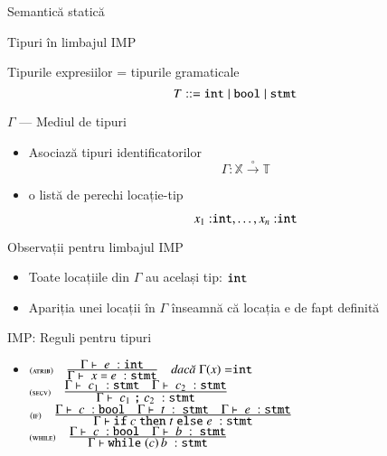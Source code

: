 \documentclass[xcolor=pdftex,romanian,colorlinks]{beamer}
\begin{document}
\begin{section}{Semantică statică}
    \begin{frame}{Tipuri în limbajul IMP}
    \begin{block}{Tipurile expresiilor = tipurile gramaticale}
    \[T ::= {\mathrel{\text{\ttfamily int}}} \mid {\ensuremath\mathrel{\text{\ttfamily bool}}} \mid {\ensuremath\mathrel{\text{\ttfamily stmt}}}\]
    \end{block}
    \begin{block}{$\Gamma$ --- Mediul de tipuri}
    \begin{itemize}
    \item Asociază tipuri identificatorilor
    \[\Gamma : \mathbb{X} \xrightarrow{\circ}\mathbb{T}\]
    \item {} o listă de perechi locație-tip

    \[x_1:\mathrel{\text{\ttfamily int}}, \ldots, x_n:\mathrel{\text{\ttfamily int}}\]
    \end{itemize}
  \end{block}
    \vfill
    \begin{block}{Observații pentru limbajul IMP}
    \begin{itemize}
    \item Toate locațiile din $\Gamma$ au același tip: $\mathrel{\text{\ttfamily int}}$
    \item Apariția unei locații în $\Gamma$ înseamnă că locația e de fapt definită
    \end{itemize}
    \end{block}
    \end{frame}

    \begin{frame}{IMP: Reguli pentru tipuri}
    \begin{itemize}
    \vitem[] $\reg[loc]{\tjud{x}{int}}{}{\Gamma(x) = \Sint}$
    \vitem[] $\reg[int]{\tjud{n}{\Sint}}{}{n \in \mathbb{Z}}$
    \vitem[] $\reg[op+]{\tjud{e_1 + e_2}{\Sint}}{\tjud{e_1}{\Sint} \si \tjud{e_2}{\Sint}}{}$
    \vitem[] $\reg[bool]{\tjud{b}{\Sbool}}{}{b\in \{\Strue,\Sfalse\}}$
    \vitem[] $\reg[op$\leq$]{\tjud{e_1 \terminal{<=} e_2}{\Sbool}}{\tjud{e_1}{\Sint} \si \tjud{e_2}{\Sint}}{}$
    \item[] $\reg[atrib]{\tjud{x\terminal{=}e}{\terminal{stmt}}}{\tjud{e}{\Sint}}{\Gamma(x) = \Sint}$
    \vitem[] $\reg[secv]{\tjud{c_1\terminal{;} c_2}{\terminal{stmt}}}{\tjud{c_1}{\terminal{stmt}}\si \tjud{c_2}{\terminal{stmt}}}{}$
    \vitem[] $\reg[if]{\tjud{\Sif c \Sthen t \Selse e}{\terminal{stmt}}}{\tjud{c}{\Sbool} \si \tjud{t}{{\terminal{stmt}}} \si \tjud{e}{\terminal{stmt}}}{}$
    \vitem[] $\reg[while]{\tjud{\Swhile (c)\,b}{\terminal{stmt}}}{\tjud{c}{\Sbool} \si \tjud{b}{{\terminal{stmt}}}}{}$
    \end{itemize}
    \end{frame}

\end{section}
\end{document}
